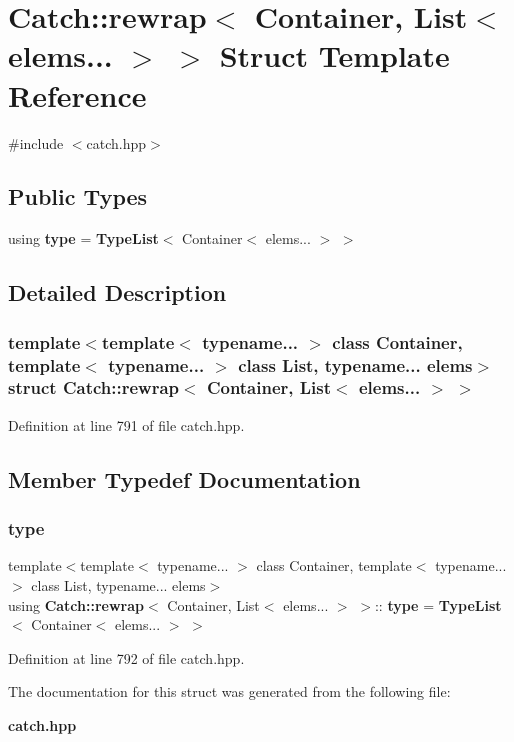 \section{Catch\+::rewrap$<$ Container, List$<$ elems... $>$ $>$ Struct Template Reference}
\label{struct_catch_1_1rewrap_3_01_container_00_01_list_3_01elems_8_8_8_01_4_01_4}


{\ttfamily \#include $<$catch.\+hpp$>$}

\subsection*{Public Types}
\begin{DoxyCompactItemize}
\item 
using \textbf{ type} = \textbf{ Type\+List}$<$ Container$<$ elems... $>$ $>$
\end{DoxyCompactItemize}


\subsection{Detailed Description}
\subsubsection*{template$<$template$<$ typename... $>$ class Container, template$<$ typename... $>$ class List, typename... elems$>$\newline
struct Catch\+::rewrap$<$ Container, List$<$ elems... $>$ $>$}



Definition at line 791 of file catch.\+hpp.



\subsection{Member Typedef Documentation}
\mbox{\label{struct_catch_1_1rewrap_3_01_container_00_01_list_3_01elems_8_8_8_01_4_01_4_ac61d11b30e96c1d6e684ead867efc8ba}} 
\subsubsection{type}
{\footnotesize\ttfamily template$<$template$<$ typename... $>$ class Container, template$<$ typename... $>$ class List, typename... elems$>$ \\
using \textbf{ Catch\+::rewrap}$<$ Container, List$<$ elems... $>$ $>$\+::\textbf{ type} =  \textbf{ Type\+List}$<$ Container$<$ elems... $>$ $>$}



Definition at line 792 of file catch.\+hpp.



The documentation for this struct was generated from the following file\+:\begin{DoxyCompactItemize}
\item 
\textbf{ catch.\+hpp}\end{DoxyCompactItemize}
